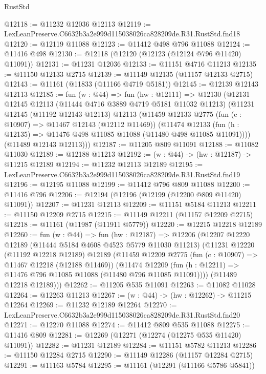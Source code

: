 \begin{lexlean}{RustStd}
\begin{coremodule}
@12118 := @11232 @12036 @12113
@12119 := LexLeanPreserve.C6632b3a2e999d115038026ca828209de.R31.RustStd.fnd18
@12120 := @12119 @11088
@12123 := @11412 @498 @796 @11088
@12124 := @11416 @498
@12130 := @12118 (@12120 (@12123 (@12124 @796 @11420) @11091))
@12131 := @11231 @12036
@12133 := @11151 @4716 @11213
@12135 := @11150 @12133 @2715
@12139 := @11149 @12135 (@11157 @12133 @2715)
@12143 := @11161 (@11833 (@11166 @4719 @5181))
@12145 := @12139 @12143 @12113
@12185 := fun (w : @44) =>
  fun (hw : @12111) =>
  @12130
    (@12131
      @12145
      @12113
      (@11444 @4716 @3889 @4719 @5181 @11032 @11213)
      (@11231
        @12145
        (@11192 @12143 @12113)
        @12113
        (@11459
          @12133
          @2775
          (fun (c : @10907) => @11467 @12143 (@12112 @11469))
          (@11474
            @12133
            (fun (h : @12135) => @11476 @498 @11085 @11088 (@11480 @498 @11085 @11091))))
        (@11489 @12143 @12113)))
@12187 := @11205 @809 @11091
@12188 := @11082 @11030
@12189 := @12188 @11213
@12192 := (w : @44) -> (hw : @12187) -> @11215 @12189
@12194 := @11232 @12113 @12189
@12195 := LexLeanPreserve.C6632b3a2e999d115038026ca828209de.R31.RustStd.fnd19
@12196 := @12195 @11088
@12199 := @11412 @796 @809 @11088
@12200 := @11416 @796
@12206 := @12194 (@12196 (@12199 (@12200 @809 @11420) @11091))
@12207 := @11231 @12113
@12209 := @11151 @5184 @11213
@12211 := @11150 @12209 @2715
@12215 := @11149 @12211 (@11157 @12209 @2715)
@12218 := @11161 (@11987 (@11911 @5779))
@12220 := @12215 @12218 @12189
@12260 := fun (w : @44) =>
  fun (hw : @12187) =>
  @12206
    (@12207
      @12220
      @12189
      (@11444 @5184 @4608 @4523 @5779 @11030 @11213)
      (@11231
        @12220
        (@11192 @12218 @12189)
        @12189
        (@11459
          @12209
          @2775
          (fun (c : @10907) => @11467 @12218 (@12188 @11469))
          (@11474
            @12209
            (fun (h : @12211) => @11476 @796 @11085 @11088 (@11480 @796 @11085 @11091))))
        (@11489 @12218 @12189)))
@12262 := @11205 @535 @11091
@12263 := @11082 @11028
@12264 := @12263 @11213
@12267 := (w : @44) -> (hw : @12262) -> @11215 @12264
@12269 := @11232 @12189 @12264
@12270 := LexLeanPreserve.C6632b3a2e999d115038026ca828209de.R31.RustStd.fnd20
@12271 := @12270 @11088
@12274 := @11412 @809 @535 @11088
@12275 := @11416 @809
@12281 := @12269 (@12271 (@12274 (@12275 @535 @11420) @11091))
@12282 := @11231 @12189
@12284 := @11151 @5782 @11213
@12286 := @11150 @12284 @2715
@12290 := @11149 @12286 (@11157 @12284 @2715)
@12291 := @11163 @5784
@12295 := @11161 (@12291 (@11166 @5786 @5841))

\end{coremodule}
\end{lexlean}
